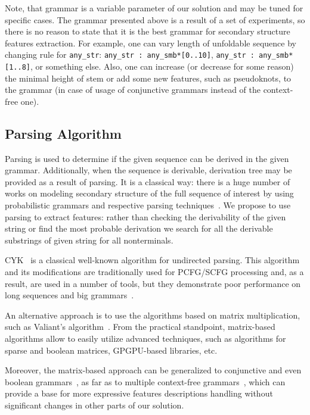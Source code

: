 \documentclass[a4paper,twoside]{article}
\begin{document}
Note, that grammar is a variable parameter of our solution and may be tuned for specific cases.
The grammar presented above is a result of a set of experiments, so there is no reason to state that it is the best grammar for secondary structure features extraction.
For example, one can vary length of unfoldable sequence by changing rule for \verb|any_str|: \verb|any_str : any_smb*[0..10]|, \verb|any_str : any_smb*[1..8]|, or something else.
Also, one can increase (or decrease for some reason) the minimal height of stem or add some new features, such as pseudoknots, to the grammar (in case of usage of conjunctive grammars instead of the context-free one).


\subsection{Parsing Algorithm}

\noindent Parsing is used to determine if the given sequence can be derived in the given grammar.
Additionally, when the sequence is derivable, derivation tree may be provided as a result of parsing. 
It is a classical way: there is a huge number of works on modeling secondary structure of the full sequence of interest by using probabilistic grammars and respective parsing techniques~\cite{knudsen2003pfold,Browny1993StochasticCG,Knudsen2005StochasticCG}.
We propose to use parsing to extract features: rather than checking the derivability of the given string or find the most probable derivation we search for all the derivable substrings of given string for all nonterminals.

CYK~\cite{Younger1967RecognitionAP} is a classical well-known algorithm for undirected parsing. 
This algorithm and its modifications are traditionally used for PCFG/SCFG processing and, as a result, are used in a number of tools, but they demonstrate poor performance on long sequences and big grammars~\cite{Liu2005}.

An alternative approach is to use the algorithms based on matrix multiplication, such as Valiant's algorithm~\cite{Valiant:1975:GCR:1739932.1740048}.
From the practical standpoint, matrix-based algorithms allow to easily utilize advanced techniques, such as algorithms for sparse and boolean matrices, GPGPU-based libraries, etc.

Moreover, the matrix-based approach can be generalized to conjunctive and even boolean grammars~\cite{OKHOTIN2014101}, as far as to multiple context-free grammars~\cite{mcfgMatrices}, which can provide a base for more expressive features descriptions handling without significant changes in other parts of our solution.
\end{document}
